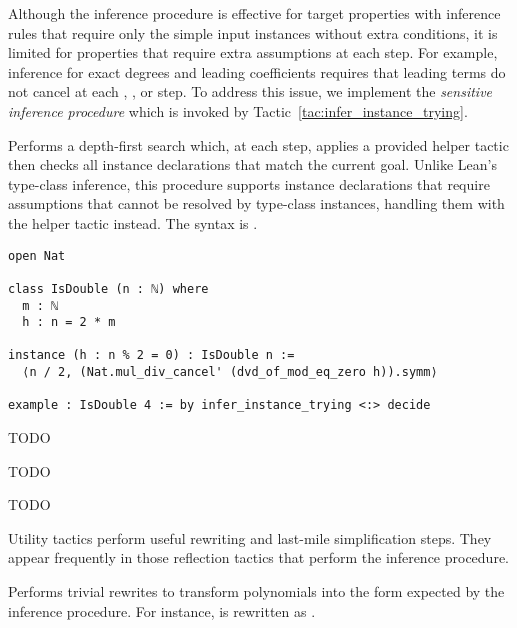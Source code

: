 Although the inference procedure is effective for target properties with inference rules that require only the simple input instances without extra conditions, it is limited for properties that require extra assumptions at each step. For example, inference for exact degrees and leading coefficients requires that leading terms do not cancel at each \leaninline{+}, \leaninline{*}, or \leaninline{\^{}} step. To address this issue, we implement the \emph{sensitive inference procedure} which is invoked by Tactic~\ref{tac:infer_instance_trying}.

\begin{tactic}
\label{tac:infer_instance_trying}
\leanok
Performs a depth-first search which, at each step, applies a provided helper tactic  then checks all instance declarations that match the current goal. Unlike Lean's type-class inference, this procedure supports instance declarations that require assumptions that cannot be resolved by type-class instances, handling them with the helper tactic instead. The syntax is \leaninline{ <:> }.
\begin{lstlisting}
open Nat

class IsDouble (n : ℕ) where
  m : ℕ
  h : n = 2 * m

instance (h : n % 2 = 0) : IsDouble n :=
  ⟨n / 2, (Nat.mul_div_cancel' (dvd_of_mod_eq_zero h)).symm⟩

example : IsDouble 4 := by infer_instance_trying <:> decide
\end{lstlisting}
\end{tactic}

\label{sec:univariate}


TODO


TODO


TODO

\label{sec:tactics}


Utility tactics perform useful rewriting and last-mile simplification steps. They appear frequently in those reflection tactics that perform the inference procedure.

\begin{tactic}
\label{tac:poly_rfl_rw}
\leanok
Performs trivial rewrites to transform polynomials into the form expected by the inference procedure. For instance,  is rewritten as .
\end{tactic}


